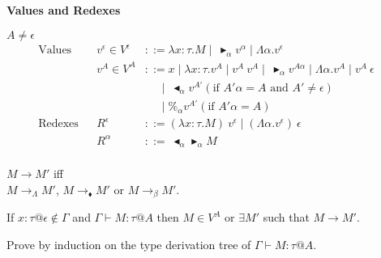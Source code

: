 \documentclass[9pt, a4paper]{extarticle}
\theoremstyle{break}
\newcommand{\figheader}[2]{
  \begin{flushleft}
    #2 {\bf \normalsize #1}
\end{flushleft}}
\newcommand{\G}{\Gamma}
\newcommand{\V}{\vdash}
\newcommand{\TB}{\blacktriangleright}
\newcommand{\TBL}{\blacktriangleleft}
\begin{document}
\figheader{Values and Redexes}{}
$A \neq \epsilon$\\
\begin{align*}
    \textrm{Values} && v^\epsilon \in V^\epsilon & ::= \lambda x:\tau.M \mid\ \TB_\alpha v^\alpha \mid \Lambda\alpha.v^\epsilon & \\
                    && v^A \in V^A & ::= x \mid \lambda x:\tau.v^A \mid v^A\ v^A \mid\ \TB_\alpha v^{A\alpha} 
                                           \mid \Lambda\alpha.v^A \mid v^A\ \epsilon &\\
                                    &&& \quad\   \mid\ \TBL_\alpha v^{A'} (\text{if } A'\alpha = A \text{ and } A' \neq \epsilon) & \\
                                    &&& \quad\   \mid \%_\alpha v^{A'} (\text{if } A'\alpha = A) & \\
    \textrm{Redexes} && R^\epsilon & ::= (\lambda x:\tau.M)\ v^\epsilon \mid (\Lambda\alpha.v^\epsilon)\ \epsilon & \\
                     && R^\alpha & ::=\ \TBL_\alpha \TB_\alpha M & \\
\end{align*}

\begin{dfn}[Reduction]
    $ M \longrightarrow M'$ iff \\
    $ M \longrightarrow_\Lambda M' $, $ M \longrightarrow_\blacklozenge M' $ or $ M \longrightarrow_\beta M' $.
\end{dfn}

\begin{thm}[Progress]
    If $x:\tau@\epsilon \notin \G$ and $\G \V M : \tau @ A$ then $ M \in V^A $ or $\exists M'$ such that $M \longrightarrow M'$.
\end{thm}

Prove by induction on the type derivation tree of $\G \V M:\tau@A$.
\end{document}

